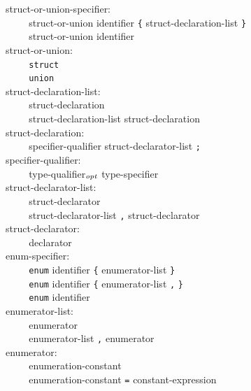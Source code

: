 \documentclass[12pt]{report}
\def\|{\verb|}
\newcommand\opt{$_{{\it opt}}$ }
\begin{document}
\noindent
struct-or-union-specifier:\\
\|    | struct-or-union identifier \verb+{+ struct-declaration-list \verb+}+\\
\|    | struct-or-union identifier\\

\noindent
struct-or-union:\\
\|    | \verb+struct+\\
\|    | \verb+union+\\

\noindent
struct-declaration-list:\\
\|    | struct-declaration\\
\|    | struct-declaration-list struct-declaration\\

\noindent
struct-declaration:\\
\|    | specifier-qualifier struct-declarator-list \verb+;+\\

\noindent
specifier-qualifier:\\
\|    | type-qualifier\opt type-specifier\\

\noindent
struct-declarator-list:\\
\|    | struct-declarator\\
\|    | struct-declarator-list \verb+,+ struct-declarator\\

\noindent
struct-declarator:\\
\|    | declarator\\

\noindent
enum-specifier:\\
\|    | \verb+enum+ identifier \verb+{+ enumerator-list \verb+}+\\
\|    | \verb+enum+ identifier \verb+{+ enumerator-list \verb+,+ \verb+}+\\
\|    | \verb+enum+ identifier\\

\noindent
enumerator-list:\\
\|    | enumerator\\
\|    | enumerator-list \verb+,+ enumerator\\

\noindent
enumerator:\\
\|    | enumeration-constant\\
\|    | enumeration-constant \verb+=+ constant-expression\\
\end{document}
